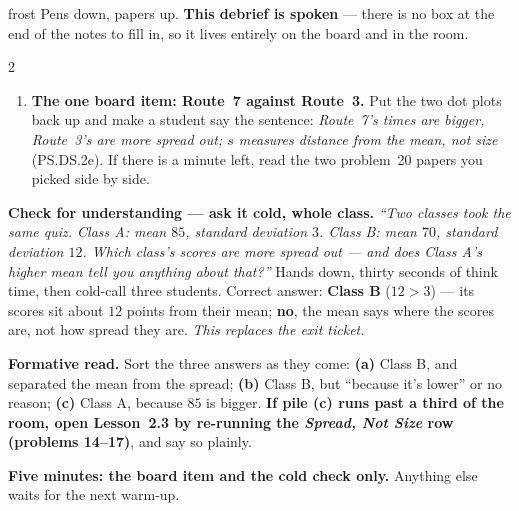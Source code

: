 \documentclass[10pt]{article}
\begin{document}
\boxguard[24]
\begin{skillbox}{frost}
Pens down, papers up. \textbf{This debrief is spoken} --- there is no box at the end of the
notes to fill in, so it lives entirely on the board and in the room.
\begin{multicols}{2}
\begin{enumerate}[leftmargin=1.3em, nosep, itemsep=3pt]
  \item \textbf{The one board item: Route~7 against Route~3.} Put the two dot plots back up
        and make a student say the sentence: \emph{Route~7's times are bigger, Route~3's are
        more spread out; $s$ measures distance from the mean, not size} (PS.DS.2e). If there is
        a minute left, read the two problem~20 papers you picked side by side.
\end{enumerate}
\columnbreak
\textbf{Check for understanding --- ask it cold, whole class.} \emph{``Two classes took the
same quiz. Class A: mean $85$, standard deviation $3$. Class B: mean $70$, standard deviation
$12$. Which class's scores are more spread out --- and does Class A's higher mean tell you
anything about that?''} Hands down, thirty seconds of think time, then cold-call three
students. Correct answer: \textbf{Class B} ($12 > 3$) --- its scores sit about $12$ points from
their mean; \textbf{no}, the mean says where the scores are, not how spread they are.
\emph{This replaces the exit ticket.}

\textbf{Formative read.} Sort the three answers as they come: \textbf{(a)} Class B, and
separated the mean from the spread; \textbf{(b)} Class B, but ``because it's lower'' or no
reason; \textbf{(c)} Class A, because $85$ is bigger. \textbf{If pile (c) runs past a third of
the room, open Lesson~2.3 by re-running the \emph{Spread, Not Size} row (problems 14--17)}, and
say so plainly.

\textbf{Five minutes: the board item and the cold check only.} Anything else waits for the
next warm-up.
\end{multicols}
\end{skillbox}
\end{document}
